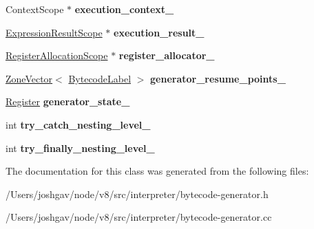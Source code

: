 \begin{DoxyCompactItemize}
\item 
Context\+Scope $\ast$ {\bfseries execution\+\_\+context\+\_\+}\hypertarget{classv8_1_1internal_1_1interpreter_1_1_bytecode_generator_af9eee168f0466ad6182a0ab9ffa50af5}{}\label{classv8_1_1internal_1_1interpreter_1_1_bytecode_generator_af9eee168f0466ad6182a0ab9ffa50af5}

\item 
\hyperlink{classv8_1_1internal_1_1interpreter_1_1_bytecode_generator_1_1_expression_result_scope}{Expression\+Result\+Scope} $\ast$ {\bfseries execution\+\_\+result\+\_\+}\hypertarget{classv8_1_1internal_1_1interpreter_1_1_bytecode_generator_a807fdc3653638f6253796dd59bada99a}{}\label{classv8_1_1internal_1_1interpreter_1_1_bytecode_generator_a807fdc3653638f6253796dd59bada99a}

\item 
\hyperlink{classv8_1_1internal_1_1interpreter_1_1_bytecode_generator_1_1_register_allocation_scope}{Register\+Allocation\+Scope} $\ast$ {\bfseries register\+\_\+allocator\+\_\+}\hypertarget{classv8_1_1internal_1_1interpreter_1_1_bytecode_generator_a188483228e52e74664fb190669d17f5a}{}\label{classv8_1_1internal_1_1interpreter_1_1_bytecode_generator_a188483228e52e74664fb190669d17f5a}

\item 
\hyperlink{classv8_1_1internal_1_1_zone_vector}{Zone\+Vector}$<$ \hyperlink{classv8_1_1internal_1_1interpreter_1_1_bytecode_label}{Bytecode\+Label} $>$ {\bfseries generator\+\_\+resume\+\_\+points\+\_\+}\hypertarget{classv8_1_1internal_1_1interpreter_1_1_bytecode_generator_a924a6831e3f2d6613ce3967df0cc4f57}{}\label{classv8_1_1internal_1_1interpreter_1_1_bytecode_generator_a924a6831e3f2d6613ce3967df0cc4f57}

\item 
\hyperlink{classv8_1_1internal_1_1interpreter_1_1_register}{Register} {\bfseries generator\+\_\+state\+\_\+}\hypertarget{classv8_1_1internal_1_1interpreter_1_1_bytecode_generator_ab85a6982d95c66370150669f77c3a267}{}\label{classv8_1_1internal_1_1interpreter_1_1_bytecode_generator_ab85a6982d95c66370150669f77c3a267}

\item 
int {\bfseries try\+\_\+catch\+\_\+nesting\+\_\+level\+\_\+}\hypertarget{classv8_1_1internal_1_1interpreter_1_1_bytecode_generator_abad178e375e46ba154da742eb51e2027}{}\label{classv8_1_1internal_1_1interpreter_1_1_bytecode_generator_abad178e375e46ba154da742eb51e2027}

\item 
int {\bfseries try\+\_\+finally\+\_\+nesting\+\_\+level\+\_\+}\hypertarget{classv8_1_1internal_1_1interpreter_1_1_bytecode_generator_a59f36bf8351b2b76e98ad7569faa0645}{}\label{classv8_1_1internal_1_1interpreter_1_1_bytecode_generator_a59f36bf8351b2b76e98ad7569faa0645}

\end{DoxyCompactItemize}


The documentation for this class was generated from the following files\+:\begin{DoxyCompactItemize}
\item 
/\+Users/joshgav/node/v8/src/interpreter/bytecode-\/generator.\+h\item 
/\+Users/joshgav/node/v8/src/interpreter/bytecode-\/generator.\+cc\end{DoxyCompactItemize}
